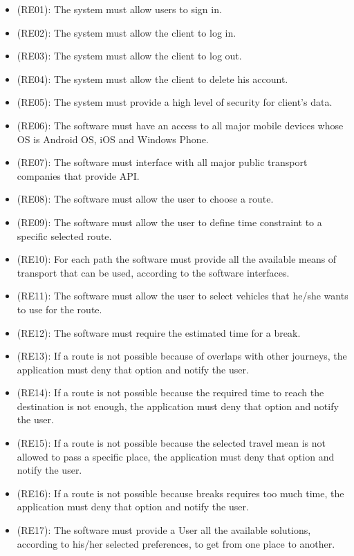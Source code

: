 \documentclass[a4paper,leqno]{book}
\begin{document}
\begin{itemize}
	
	\item (RE01): The system must allow users to sign in.
	\item (RE02): The system must allow the client to log in.
	\item (RE03): The system must allow the client to log out.
	\item (RE04): The system must allow the client to delete his account.
	\item (RE05): The system must provide a high level of security for client's data.
	\item (RE06): The software must have an access to all major mobile devices whose OS is Android OS, iOS and Windows Phone.
	\item (RE07): The software must interface with all major public transport companies that provide API.
	\item (RE08): The software must allow the user to choose a route.
	\item (RE09): The software must allow the user to define time constraint to a specific selected route.
	\item (RE10): For each path the software must provide all the available means of transport that can be used, according to the software interfaces.
	\item (RE11): The software must allow the user to select vehicles that he/she wants to use for the route.
	\item (RE12): The software must require the estimated time for a break.
	\item (RE13): If a route is not possible because of overlaps with other journeys, the application must deny that option and notify the user.
	\item (RE14): If a route is not possible because the required time to reach the destination is not enough, the application must deny that option and notify the user.
	\item (RE15): If a route is not possible because the selected travel mean is not allowed to pass a specific place, the application must deny that option and notify the user.
	\item (RE16): If a route is not possible because breaks requires too much time, the application must deny that option and notify the user.
	\item (RE17): The software must provide a User all the available solutions, according to his/her selected preferences, to get from one place to another.

\end{itemize}
\end{document}
